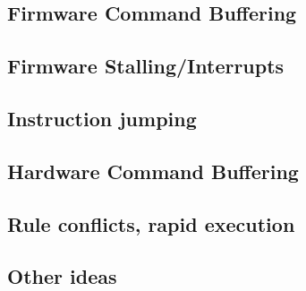 \documentclass[a4paper,8pt]{report}
\begin{document}


\subsection{Firmware Command Buffering}


\subsection{Firmware Stalling/Interrupts}
\subsection{Instruction jumping}

\subsection{Hardware Command Buffering}

\subsection{Rule conflicts, rapid execution}


\subsection{Other ideas}
\end{document}
